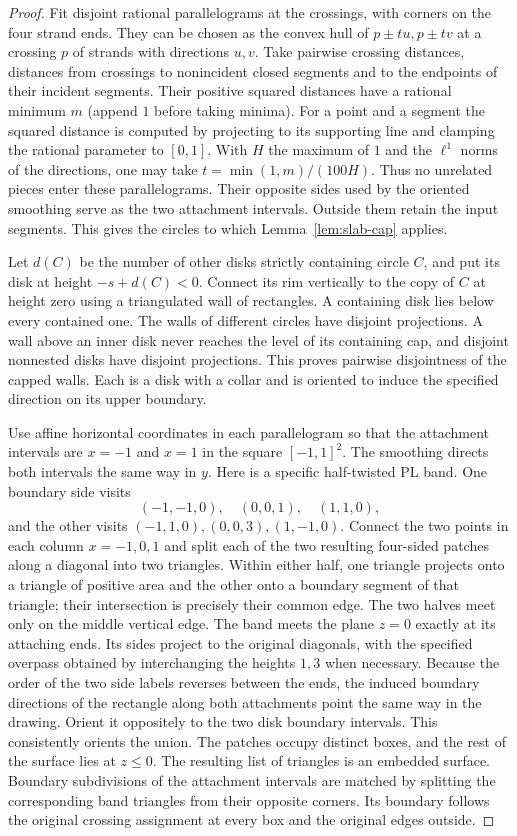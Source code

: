\begin{proof}
Fit disjoint rational parallelograms at the crossings, with corners
on the four strand ends. They can be chosen as the convex hull of
$p\pm t u,p\pm t v$ at a crossing $p$ of strands with directions
$u,v$. Take pairwise crossing distances, distances from crossings to
nonincident closed segments and to the endpoints of their incident
segments. Their positive squared distances have a rational minimum $m$
(append $1$ before taking minima). For a point and a segment the squared
distance is computed by projecting to its supporting line and clamping
the rational parameter to $[0,1]$. With $H$ the maximum of $1$ and
the $\ell^1$ norms of the directions, one may take
$t=\min(1,m)/(100H)$. Thus no unrelated pieces enter these
parallelograms. Their opposite sides used by the oriented smoothing
serve as the two attachment intervals. Outside them retain the input
segments. This gives the circles to which Lemma~\ref{lem:slab-cap}
applies.

Let $d(C)$ be the number of other disks strictly containing circle $C$,
and put its disk at height $-s+d(C)<0$. Connect its rim vertically
to the copy of $C$ at height zero using a triangulated wall of
rectangles. A containing disk lies below every contained one. The walls
of different circles have disjoint projections. A wall above an inner
disk never reaches the level of its containing cap, and disjoint
nonnested disks have disjoint projections. This proves pairwise
disjointness of the capped walls. Each is a disk with a collar and is
oriented to induce the specified direction on its upper boundary.

Use affine horizontal coordinates in each parallelogram so that the
attachment intervals are $x=-1$ and $x=1$ in the square $[-1,1]^2$.
The smoothing directs both intervals the same way in $y$. Here is a
specific half-twisted PL band. One boundary side visits
\[
 (-1,-1,0),\quad (0,0,1),\quad (1,1,0),
\]
and the other visits $(-1,1,0),(0,0,3),(1,-1,0)$.
Connect the two points in each column $x=-1,0,1$ and split each of the
two resulting four-sided patches along a diagonal into two triangles.
Within either half, one triangle projects onto a triangle of positive
area and the other onto a boundary segment of that triangle; their
intersection is precisely their common edge. The two halves meet only
on the middle vertical edge. The band meets the plane $z=0$ exactly
at its attaching ends. Its sides project to the original diagonals,
with the specified overpass obtained by interchanging the heights
$1,3$ when necessary. Because the order of the two side labels reverses
between the ends, the induced boundary directions of the rectangle
along both attachments point the same way in the drawing. Orient it
oppositely to the two disk boundary intervals. This consistently
orients the union. The patches occupy distinct boxes, and the rest of
the surface lies at $z\leq0$. The resulting list of triangles is an
embedded surface. Boundary subdivisions of the attachment intervals
are matched by splitting the corresponding band triangles from their
opposite corners. Its boundary follows the original crossing assignment
at every box and the original edges outside.


\end{proof}
